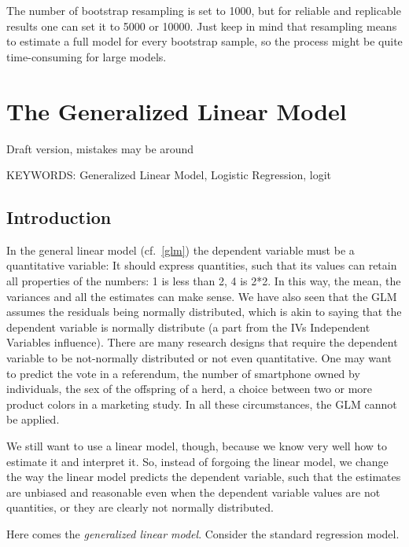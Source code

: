 \documentclass[
]{book}
\begin{document}
The number of bootstrap resampling is set to 1000, but for reliable and replicable results one can set it to 5000 or 10000. Just keep in mind that resampling means to estimate a full model for every bootstrap sample, so the process might be quite time-consuming for large models.

\hypertarget{gzlm}{%
\chapter{The Generalized Linear Model}\label{gzlm}}

{ Draft version, mistakes may be around }

\begin{flushright} KEYWORDS: Generalized Linear Model, Logistic Regression, logit  \end{flushright}

\hypertarget{gzlmintro}{%
\section{Introduction}\label{gzlmintro}}

In the general linear model (cf.~\ref{glm}) the dependent variable must be a quantitative variable: It should express quantities, such that its values can retain all properties of the numbers: 1 is less than 2, 4 is 2*2. In this way, the mean, the variances and all the estimates can make sense. We have also seen that the GLM assumes the residuals being normally distributed, which is akin to saying that the dependent variable is normally distribute (a part from the {IVs {Independent Variables} } influence). There are many research designs that require the dependent variable to be not-normally distributed or not even quantitative. One may want to predict the vote in a referendum, the number of smartphone owned by individuals, the sex of the offspring of a herd, a choice between two or more product colors in a marketing study. In all these circumstances, the GLM cannot be applied.

We still want to use a linear model, though, because we know very well how to estimate it and interpret it. So, instead of forgoing the linear model, we change the way the linear model predicts the dependent variable, such that the estimates are unbiased and reasonable even when the dependent variable values are not quantities, or they are clearly not normally distributed.

Here comes the \emph{generalized linear model}. Consider the standard regression model.
\end{document}
